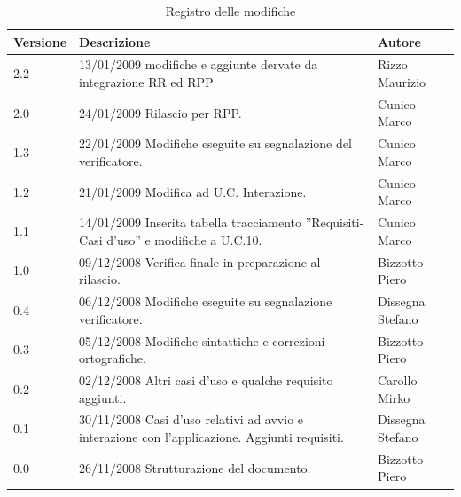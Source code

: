 \begin{center}
	\begin{table}[h]
		  \begin{tabular*}
			{1\textwidth}%
					 {@{\extracolsep{\fill}}|p{}|p{}|p{}|}
		 \hline
			\textbf{Versione}  & \textbf{Descrizione} & \textbf{Autore} \\

                \hline
                2.2 & 13$\slash$01$\slash$2009 modifiche e aggiunte dervate da integrazione RR ed RPP & Rizzo Maurizio\\
                \hline
				2.0 & 24$\slash$01$\slash$2009 Rilascio per RPP. & Cunico Marco \\
		\hline
				1.3 & 22$\slash$01$\slash$2009 Modifiche eseguite su segnalazione del verificatore.  & Cunico Marco \\
                \hline
				1.2 & 21$\slash$01$\slash$2009 Modifica ad U.C. Interazione.  & Cunico Marco \\
                \hline
				1.1 & 14$\slash$01$\slash$2009 Inserita tabella tracciamento ''Requisiti-Casi d'uso'' e modifiche a U.C.10. & Cunico Marco \\
				\hline
				1.0 & 09$\slash$12$\slash$2008  Verifica finale in preparazione al rilascio. & Bizzotto Piero \\
				\hline
				0.4 & 06$\slash$12$\slash$2008 Modifiche eseguite su segnalazione verificatore. & Dissegna Stefano \\
				\hline
				0.3 & 05$\slash$12$\slash$2008 Modifiche sintattiche e correzioni ortografiche. & Bizzotto Piero \\
				\hline
				0.2 & 02$\slash$12$\slash$2008 Altri casi d'uso e qualche requisito aggiunti. & Carollo Mirko \\
                \hline
                0.1 & 30$\slash$11$\slash$2008 Casi d'uso relativi ad avvio e interazione con l'applicazione. Aggiunti requisiti. & Dissegna Stefano \\
				\hline	
    	 	     0.0 & 26$\slash$11$\slash$2008 Strutturazione del documento. & Bizzotto Piero \\

		\hline %
		\end{tabular*}
	\caption{Registro delle modifiche} %
	\label{tab:modifiche}
	\end{table}
\end{center}

